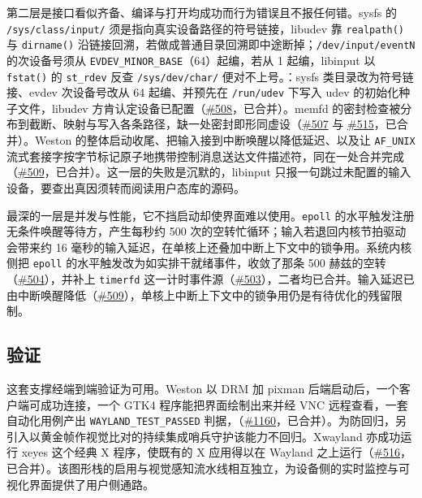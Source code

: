 第二层是接口看似齐备、编译与打开均成功而行为错误且不报任何错。sysfs 的 \texttt{/sys/\allowbreak class/\allowbreak input/} 须是指向真实设备路径的符号链接，libudev 靠 \texttt{realpath()} 与 \texttt{dirname()} 沿链接回溯，若做成普通目录回溯即中途断掉；\texttt{/dev/\allowbreak input/\allowbreak eventN} 的次设备号须从 \texttt{EVDEV\_MINOR\_BASE}（64）起编，若从 1 起编，libinput 以 \texttt{fstat()} 的 \texttt{st\_rdev} 反查 \texttt{/sys/\allowbreak dev/\allowbreak char/} 便对不上号。：sysfs 类目录改为符号链接、evdev 次设备号改从 64 起编、并预先在 \texttt{/run/udev} 下写入 udev 的初始化种子文件，libudev 方肯认定设备已配置（\href{https://github.com/rcore-os/tgoskits/pull/508}{\#508}，已合并）。memfd 的密封检查被分布到截断、映射与写入各条路径，缺一处密封即形同虚设（\href{https://github.com/rcore-os/tgoskits/pull/507}{\#507} 与 \href{https://github.com/rcore-os/tgoskits/pull/515}{\#515}，已合并）。Weston 的整体启动收尾、把输入接到中断唤醒以降低延迟、以及让 \texttt{AF\_UNIX} 流式套接字按字节标记原子地携带控制消息送达文件描述符，同在一处合并完成（\href{https://github.com/rcore-os/tgoskits/pull/509}{\#509}，已合并）。这一层的失败是沉默的，libinput 只报一句跳过未配置的输入设备，要查出真因须转而阅读用户态库的源码。

最深的一层是并发与性能，它不挡启动却使界面难以使用。\texttt{epoll} 的水平触发注册无条件唤醒等待方，产生每秒约 500 次的空转忙循环；输入若退回内核节拍驱动会带来约 16 毫秒的输入延迟，在单核上还叠加中断上下文中的锁争用。系统内核侧把 \texttt{epoll} 的水平触发改为如实排干就绪事件，收敛了那条 500 赫兹的空转（\href{https://github.com/rcore-os/tgoskits/pull/504}{\#504}），并补上 \texttt{timerfd} 这一计时事件源（\href{https://github.com/rcore-os/tgoskits/pull/503}{\#503}），二者均已合并。输入延迟已由中断唤醒降低（\href{https://github.com/rcore-os/tgoskits/pull/509}{\#509}），单核上中断上下文中的锁争用仍是有待优化的残留限制。

\subsection{验证}

这套支撑经端到端验证为可用。Weston 以 DRM 加 pixman 后端启动后，一个客户端可成功连接，一个 GTK4 程序能把界面绘制出来并经 VNC 远程查看，一套自动化用例产出 \texttt{WAYLAND\_TEST\_PASSED} 判据，（\href{https://github.com/rcore-os/tgoskits/pull/1160}{\#1160}，已合并）。为防回归，另引入以黄金帧作视觉比对的持续集成哨兵守护该能力不回归。Xwayland 亦成功运行 xeyes 这个经典 X 程序，使既有的 X 应用得以在 Wayland 之上运行（\href{https://github.com/rcore-os/tgoskits/pull/516}{\#516}，已合并）。该图形栈的启用与视觉感知流水线相互独立，为设备侧的实时监控与可视化界面提供了用户侧通路。
